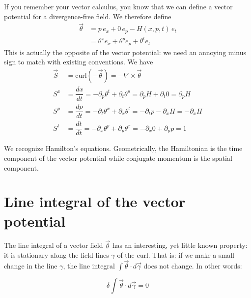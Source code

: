 \documentclass[aps,pra,10pt,floatfix,nofootinbib]{revtex4-1}
\theoremstyle{definition}
\begin{document}
If you remember your vector calculus, you know that we can define a vector potential for a divergence-free field. We therefore define
\begin{equation}
\begin{aligned}
\vec{\theta} &= p \, e_x + 0 \, e_p - H(x,p,t) \, e_t \\ 
&= \theta^x e_x + \theta^p e_p + \theta^t e_t 
\end{aligned}
\label{potential}
\end{equation}
This is actually the opposite of the vector potential: we need an annoying minus sign to match with existing conventions. We have
\begin{equation}
\begin{aligned}
\vec{S} &= \mathrm{curl}(-\vec{\theta}) = - \nabla \times \vec{\theta} \\
S^x &= \dfrac{dx}{dt} = - \partial_p \theta^t + \partial_t \theta^p = \partial_p H + \partial_t 0 = \partial_p H \\
S^p &= \dfrac{dp}{dt} = - \partial_t \theta^x + \partial_x \theta^t = -\partial_t p - \partial_x H = - \partial_x H \\
S^t &= \dfrac{dt}{dt} = - \partial_x \theta^p + \partial_p \theta^x = - \partial_x 0 + \partial_p p = 1
\end{aligned}
\label{HamiltonEquations}
\end{equation}

We recognize Hamilton's equations. Geometrically, the Hamiltonian is the time component of the vector potential while conjugate momentum is the spatial component.

\section{Line integral of the vector potential}

The line integral of a vector field $\vec{\theta}$ has an interesting, yet little known property: it is stationary along the field lines $\gamma$ of the curl. That is: if we make a small change in the line $\gamma$, the line integral $\int \vec{\theta} \cdot d\vec{\gamma}$ does not change. In other words:

\begin{equation}
\delta \int \vec{\theta} \cdot d\vec{\gamma} = 0
\label{stationaryLineIntegral}
\end{equation}
\end{document}
